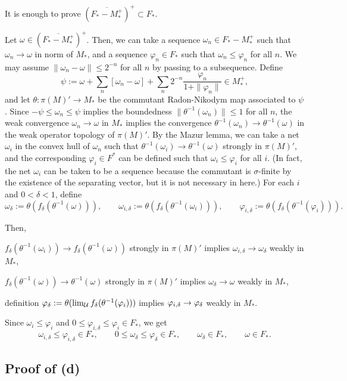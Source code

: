 \documentclass{../../../../small}
\begin{document}
\begin{pf}[Proof of (b)]
It is enough to prove $(\overline{F_*-M_*^+})^+\subset F_*$.

Let $\omega\in(\overline{F_*-M_*^+})^+$.
Then, we can take a sequence $\omega_n\in F_*-M_*^+$ such that $\omega_n\to\omega$ in norm of $M_*$, and a sequence $\varphi_n\in F_*$ such that $\omega_n\le\varphi_n$ for all $n$.
We may assume $\|\omega_n-\omega\|\le2^{-n}$ for all $n$ by passing to a subsequence.
Define
\[\psi:=\omega+\sum_n[\omega_n-\omega]+\sum_n2^{-n}\frac{\varphi_n}{1+\|\varphi_n\|}\in M_*^+,\]
and let $\theta:\pi(M)'\to M_*$ be the commutant Radon-Nikodym map associated to $\psi$.
Since $-\psi\le\omega_n\le\psi$ implies the boundedness $\|\theta^{-1}(\omega_n)\|\le1$ for all $n$, the weak convergence $\omega_n\to\omega$ in $M_*$ implies the convergence $\theta^{-1}(\omega_n)\to\theta^{-1}(\omega)$ in the weak operator topology of $\pi(M)'$.
By the Mazur lemma, we can take a net $\omega_i$ in the convex hull of $\omega_n$ such that $\theta^{-1}(\omega_i)\to\theta^{-1}(\omega)$ strongly in $\pi(M)'$, and the corresponding $\varphi_i\in F^*$ can be defined such that $\omega_i\le\varphi_i$ for all $i$.
(In fact, the net $\omega_i$ can be taken to be a sequence because the commutant is $\sigma$-finite by the existence of the separating vector, but it is not necessary in here.)
For each $i$ and $0<\delta<1$, define
\[\omega_\delta:=\theta(f_\delta(\theta^{-1}(\omega))),\qquad\omega_{i,\delta}:=\theta(f_\delta(\theta^{-1}(\omega_i))),\qquad\varphi_{i,\delta}:=\theta(f_\delta(\theta^{-1}(\varphi_i))).\]

Then,

$f_\delta(\theta^{-1}(\omega_i))\to f_\delta(\theta^{-1}(\omega))$ strongly in $\pi(M)'$ implies $\omega_{i,\delta}\to\omega_\delta$ weakly in $M_*$,

$f_\delta(\theta^{-1}(\omega))\to\theta^{-1}(\omega)$ strongly in $\pi(M)'$ implies $\omega_\delta\to\omega$ weakly in $M_*$,

definition $\varphi_\delta:=\theta(\lim_{\mathcal{U}} f_\delta(\theta^{-1}(\varphi_i)))$ implies
$\varphi_{i,\delta}\to\varphi_\delta$ weakly in $M_*$.


Since $\omega_i\le\varphi_i$ and $0\le\varphi_{i,\delta}\le\varphi_i\in F_*$, we get
\[\omega_{i,\delta}\le\varphi_{i,\delta}\in F_*,\qquad 0\le\omega_\delta\le\varphi_\delta\in F_*,\qquad\omega_\delta\in F_*,\qquad\omega\in F_*.\]
\end{pf}



\subsection{Proof of (d)}
\end{document}
